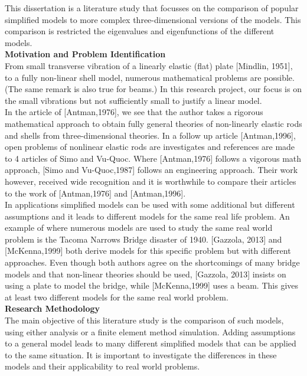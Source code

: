 \documentclass[../main.tex]{subfiles}
\begin{document}
This dissertation is a literature study that focusses on the comparison of popular simplified models to more complex three-dimensional versions of the models. This comparison is restricted the eigenvalues and eigenfunctions of the different models.\\

\textbf{Motivation and Problem Identification}\\
From small transverse vibration of a linearly elastic (flat) plate [Mindlin, 1951], to a fully non-linear shell model, numerous mathematical problems are possible. (The same remark is also true for beams.) In this research project, our focus is on the small vibrations but not sufficiently small to justify a linear model.\\

In the article of [Antman,1976], we see that the author takes a rigorous mathematical approach to obtain fully general theories of non-linearly elastic rods and shells from three-dimensional theories. In a follow up article [Antman,1996], open problems of nonlinear elastic rods are investigates and references are made to 4 articles of Simo and Vu-Quoc. Where [Antman,1976] follows a vigorous math approach, [Simo and Vu-Quoc,1987] follows an engineering approach. Their work however, received wide recognition and it is worthwhile to compare their articles to the work of [Antman,1976] and [Antman,1996].\\

In applications simplified models can be used with some additional but different assumptions and it leads to different models for the same real life problem. An example of where numerous models are used to study the same real world problem is the Tacoma Narrows Bridge disaster of 1940. [Gazzola, 2013] and [McKenna,1999] both derive models for this specific problem but with different approaches. Even though both authors agree on the shortcomings of many bridge models and that non-linear theories should be used, [Gazzola, 2013] insists on using a plate to model the bridge, while [McKenna,1999] uses a beam. This gives at least two different models for the same real world problem.\\


\textbf{Research Methodology}\\
The main objective of this literature study is the comparison of such models, using either analysis or a finite element method simulation. Adding assumptions to a general model leads to many different simplified models that can be applied to the same situation. It is important to investigate the differences in these models and their applicability to real world problems.\\
\end{document}
